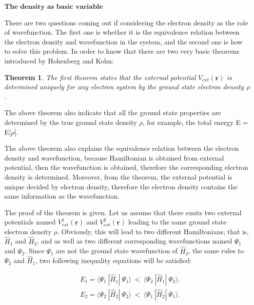 \documentclass[a4paper, 12pt, titlepage,oneside,drop]{kthesis}
\newtheorem{thm}{Theorem}
\begin{document}
$\textbf{The density as basic variable}$ 

There are two questions coming out if considering the electron density as the role of wavefunction. The first one is whether it
 is the equivalence relation between the electron density and wavefunction in the system, and the second one is how to solve this 
problem. In order to know that there are two very basic theorems introduced by Hohenberg and Kohn:

\begin{thm}
\label{hk1}
\noindent The first theorem states that the external potential $V_\textit{ext}(\textbf{r})$  is determined uniquely for any electron system by the ground state electron density $\rho$.
\end{thm}

The above theorem also indicate that all the ground state properties are determined by the true ground state density $\rho$,
for example, the total energy E = E[$\rho$]. 

The above theorem also explains the equivalence relation between the electron density and wavefunction, because Hamiltonian is obtained from external potential,
then the wavefunction is obtained, therefore the corresponding electron density is determined. Moreover, from the theorem, the external potential is unique decided by electron
density, therefore the electron density contains the same information as the wavefunction.

The proof of the theorem is given. Let us assume that there exsits two external potentials named $V^{1}_\textit{ext}(\textbf{r})$ and $V^{2}_\textit{ext}(\textbf{r})$ leading to the same ground state 
electron density $\rho$. Obviously, this will lead to two different Hamiltonians, that is, $\hat{H}_{1}$ and $\hat{H}_{2}$, and as well as two different corresponding
wavefunctions named $\Psi_1$ and $\Psi_2$. Since $\Psi_1$ are not the ground state wavefunction of $\hat{H}_{2}$, the same rules to $\Psi_2$ and $\hat{H}_{1}$, two following
inequality equations will be satisfied:

\begin{equation}\label{hkpf1}\begin{split}
&  E_1 = \langle \Psi_1\ |\hat{H}_{1}|\ \Psi_1 \rangle  \ < \  \langle \Psi_2\ |\hat{H}_{1}|\ \Psi_2 \rangle.\\
&  E_2 = \langle \Psi_2\ |\hat{H}_{2}|\ \Psi_2 \rangle  \ < \  \langle \Psi_1\ |\hat{H}_{2}|\ \Psi_1 \rangle.
\end{split}\end{equation}
\end{document}
